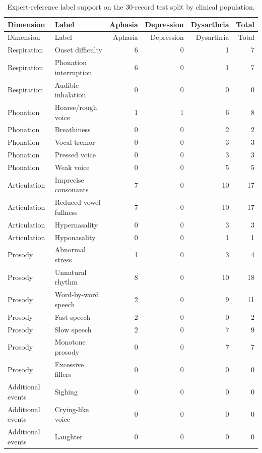 \documentclass[10pt]{article}
\begin{document}
\begin{longtable}{llrrrr}
\caption{Expert-reference label support on the 30-record test split by clinical population.}\label{tab:test_label_support}\\
\toprule
Dimension & Label & Aphasia & Depression & Dysarthria & Total \\
\midrule
\endfirsthead
\toprule
Dimension & Label & Aphasia & Depression & Dysarthria & Total \\
\midrule
\endhead

Respiration & Onset difficulty & 6 & 0 & 1 & 7 \\
Respiration & Phonation interruption & 6 & 0 & 1 & 7 \\
Respiration & Audible inhalation & 0 & 0 & 0 & 0 \\
Phonation & Hoarse/rough voice & 1 & 1 & 6 & 8 \\
Phonation & Breathiness & 0 & 0 & 2 & 2 \\
Phonation & Vocal tremor & 0 & 0 & 3 & 3 \\
Phonation & Pressed voice & 0 & 0 & 3 & 3 \\
Phonation & Weak voice & 0 & 0 & 5 & 5 \\
Articulation & Imprecise consonants & 7 & 0 & 10 & 17 \\
Articulation & Reduced vowel fullness & 7 & 0 & 10 & 17 \\
Articulation & Hypernasality & 0 & 0 & 3 & 3 \\
Articulation & Hyponasality & 0 & 0 & 1 & 1 \\
Prosody & Abnormal stress & 1 & 0 & 3 & 4 \\
Prosody & Unnatural rhythm & 8 & 0 & 10 & 18 \\
Prosody & Word-by-word speech & 2 & 0 & 9 & 11 \\
Prosody & Fast speech & 2 & 0 & 0 & 2 \\
Prosody & Slow speech & 2 & 0 & 7 & 9 \\
Prosody & Monotone prosody & 0 & 0 & 7 & 7 \\
Prosody & Excessive fillers & 0 & 0 & 0 & 0 \\
Additional events & Sighing & 0 & 0 & 0 & 0 \\
Additional events & Crying-like voice & 0 & 0 & 0 & 0 \\
Additional events & Laughter & 0 & 0 & 0 & 0 \\
\bottomrule
\end{longtable}
\end{document}
